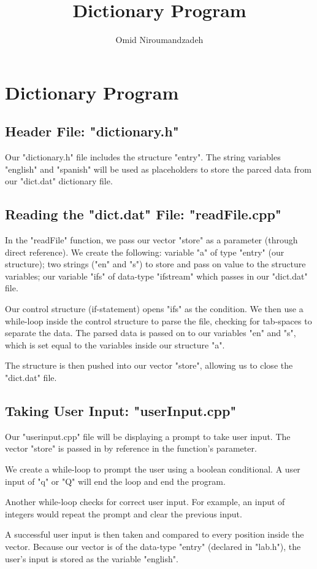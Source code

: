 \documentclass{article}
\begin{document}
\title{Dictionary Program}
\author{Omid Niroumandzadeh}
\section{Dictionary Program}
\subsection{Header File: "dictionary.h"}
Our "dictionary.h" file includes the structure "entry". The 
string variables "english" and "spanish" will be used
as placeholders to store the parced data from our
"dict.dat" dictionary file.
\clearpage
\subsection{Reading the "dict.dat" File: "readFile.cpp"}
In the "readFile" function, we pass our vector "store" as a 
parameter (through direct reference). We create the following: 
variable "a" of type "entry" (our structure); two strings ("en" and "s")
to store and pass on value to the structure variables; our 
variable "ifs" of data-type "ifstream" which passes in our
"dict.dat" file.

Our control structure (if-statement) opens "ifs" as the condition. 
We then use a while-loop inside the control structure to parse
the file, checking for tab-spaces to separate the data. The parsed
data is passed on to our variables "en" and "s", which is set equal
to the variables inside our structure "a".

The structure is then pushed into our vector "store", allowing us
to close the "dict.dat" file.
\clearpage
\subsection{Taking User Input: "userInput.cpp"}
Our "userinput.cpp" file will be displaying a prompt to take user input.
The vector "store" is passed in by reference in the function's
parameter.

We create a while-loop to prompt the user using a boolean
conditional. A user input of "q" or "Q" will end the loop
and end the program.

Another while-loop checks for correct user input. For example,
an input of integers would repeat the prompt and clear the
previous input.

A successful user input is then taken and compared to every position
inside the vector. Because our vector is of the data-type "entry" 
(declared in "lab.h"), the user's input is stored as the variable 
"english".  
\clearpage
\end{document}
